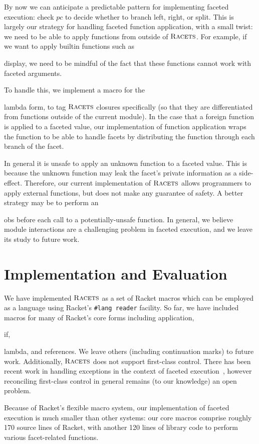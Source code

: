 \documentclass[review=true,acmlarge]{acmart}
\newcommand*{\SavedLstInline}{}
\DeclareRobustCommand*{\lstinline}{%
  \ifmmode
    \let\SavedBGroup\bgroup
    \def\bgroup{%
      \let\bgroup\SavedBGroup
      \hbox\bgroup
    }%
  \fi
  \SavedLstInline
}
\newcommand{\colorMATH}{black!20!blue}
\newcommand{\bmth}[1] {{\color{\colorMATH} $#1$}}
\newcommand{\code}[1]{\lstinline{#1}}
\newcommand{\racets}[0]{$\textsc{Racets}$\xspace}
\begin{document}
By now we can anticipate a predictable pattern for implementing
faceted execution: check \bmth{pc} to decide whether to branch left,
right, or split. This is largely our strategy for handling faceted
function application, with a small twist: we need to be able to apply
functions from outside of \racets. For example, if we want to apply
builtin functions such as \code{display}, we need to be mindful of the
fact that these functions cannot work with faceted arguments.

To handle this, we implement a macro for the \code{lambda} form, to
tag \racets closures specifically (so that they are differentiated from
functions outside of the current module). In the case that a foreign
function is applied to a faceted value, our implementation of function
application wraps the function to be able to handle facets by
distributing the function through each branch of the facet.

In general it is unsafe to apply an unknown function to a faceted
value. This is because the unknown function may leak the facet's
private information as a side-effect. Therefore, our current
implementation of \racets allows programmers to apply external
functions, but does not make any guarantee of safety. A better
strategy may be to perform an \code{obs} before each call to a
potentially-unsafe function. In general, we believe module
interactions are a challenging problem in faceted execution, and we
leave its study to future work.

\section{Implementation and Evaluation}

We have implemented \racets as a set of Racket macros which can be
employed as a language using Racket's \texttt{\#lang reader}
facility. So far, we have included macros for many of Racket's core
forms including application, \code{if}, \code{lambda}, and
references. We leave others (including continuation marks) to future
work. Additionally, \racets does not support first-class control. There
has been recent work in handling exceptions in the context of faceted
execution~\cite{Austin:17}, however reconciling first-class control in
general remains (to our knowledge) an open problem.

Because of Racket's flexible macro system, our implementation of
faceted execution is much smaller than other systems: our core macros
comprise roughly 170 source lines of Racket, with another 120 lines of
library code to perform various facet-related functions.
\end{document}

